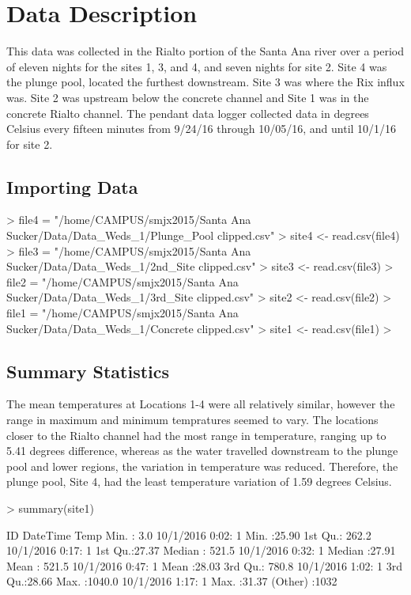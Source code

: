 \documentclass{article}
\begin{document}


\section{Data Description}

This data was collected in the Rialto portion of the Santa Ana river over a period of eleven nights for the sites 1, 3, and 4, and seven nights for site 2. Site 4 was the plunge pool, located the furthest downstream. Site 3 was where the Rix influx was. Site 2 was upstream below the concrete channel and Site 1 was in the concrete Rialto channel. The pendant data logger collected data in degrees Celsius every fifteen minutes from 9/24/16 through 10/05/16, and until 10/1/16 for site 2. 


\subsection{Importing Data}


\begin{Schunk}
\begin{Sinput}
> file4 = "/home/CAMPUS/smjx2015/Santa Ana Sucker/Data/Data_Weds_1/Plunge_Pool clipped.csv"
> site4 <- read.csv(file4)
> file3 = "/home/CAMPUS/smjx2015/Santa Ana Sucker/Data/Data_Weds_1/2nd_Site clipped.csv"
> site3 <- read.csv(file3)
> file2 = "/home/CAMPUS/smjx2015/Santa Ana Sucker/Data/Data_Weds_1/3rd_Site clipped.csv"
> site2 <- read.csv(file2)
> file1 = "/home/CAMPUS/smjx2015/Santa Ana Sucker/Data/Data_Weds_1/Concrete clipped.csv"
> site1 <- read.csv(file1)
> 
\end{Sinput}
\end{Schunk}


\subsection{Summary Statistics}

The mean temperatures at Locations 1-4 were all relatively similar, however the range in maximum and minimum tempratures seemed to vary. The locations closer to the Rialto channel had the most range in temperature, ranging up to 5.41 degrees difference, whereas as the water travelled downstream to the plunge pool and lower regions, the variation in temperature was reduced. Therefore, the plunge pool, Site 4, had the least temperature variation of 1.59 degrees Celsius.
\begin{Schunk}
\begin{Sinput}
> summary(site1)
\end{Sinput}
\begin{Soutput}
       ID                   DateTime         Temp      
 Min.   :   3.0   10/1/2016 0:02:   1   Min.   :25.90  
 1st Qu.: 262.2   10/1/2016 0:17:   1   1st Qu.:27.37  
 Median : 521.5   10/1/2016 0:32:   1   Median :27.91  
 Mean   : 521.5   10/1/2016 0:47:   1   Mean   :28.03  
 3rd Qu.: 780.8   10/1/2016 1:02:   1   3rd Qu.:28.66  
 Max.   :1040.0   10/1/2016 1:17:   1   Max.   :31.37  
                  (Other)       :1032                  
\end{Soutput}
\end{Schunk}
\end{document}
